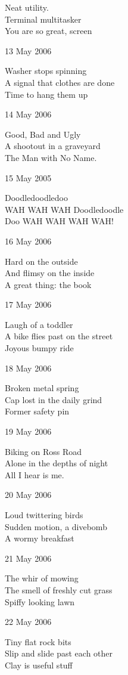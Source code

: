 \documentclass[12pt]{article}
\begin{document}
Neat utility. \\
Terminal multitasker \\
You are so great, screen

13 May 2006

Washer stops spinning \\
A signal that clothes are done \\ 
Time to hang them up


\newpage

14 May 2006

Good, Bad and Ugly \\
A shootout in a graveyard \\
The Man with No Name. 

15 May 2005

Doodledoodledoo \\
WAH WAH WAH Doodledoodle \\
Doo WAH WAH WAH WAH!

16 May 2006

Hard on the outside \\
And flimsy on the inside \\
A great thing: the book

17 May 2006

Laugh of a toddler \\
A bike flies past on the street \\
Joyous bumpy ride

18 May 2006

Broken metal spring \\
Cap lost in the daily grind \\
Former safety pin

19 May 2006

Biking on Ross Road \\
Alone in the depths of night \\
All I hear is me.

\newpage

20 May 2006

Loud twittering birds \\
Sudden motion, a divebomb \\
A wormy breakfast

21 May 2006

The whir of mowing \\
The smell of freshly cut grass \\
Spiffy looking lawn

22 May 2006

Tiny flat rock bits \\
Slip and slide past each other \\
Clay is useful stuff
\end{document}
